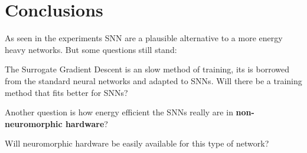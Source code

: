 \section{Conclusions}
\label{sec:conclusions}
	\par As seen in the experiments SNN are a plausible alternative to a more energy heavy networks. But some questions still stand: 
	\par The Surrogate Gradient Descent is an slow method of training, its is borrowed from the standard neural networks and adapted to SNNs. Will there be a training method that fits better for SNNs? 
	\par Another question is how energy efficient the SNNs really are in \textbf{non-neuromorphic hardware}?
	\par Will neuromorphic hardware be easily available for this type of network?